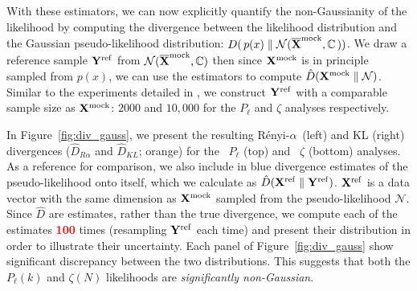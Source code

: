 \documentclass[12pt, letterpaper, preprint]{aastex}
\newcommand{\todo}[1]{{\bf \textcolor{red}{#1}}}
\newcommand{\Xmock}{{\bf X}^\mathrm{mock}}
\newcommand{\Xref}{{\bf X}^\mathrm{ref}}
\newcommand{\Yref}{{\bf Y}^\mathrm{ref}}
\newcommand{\Ralpha}{R\'enyi-$\alpha$}
\newcommand{\Beut}{\citetalias{beutler2017}}
\newcommand{\Sinh}{\citetalias{sinha2017a}}
\begin{document}
With these estimators, we can now explicitly quantify the 
non-Gaussianity of the likelihood by computing the divergence 
between the likelihood distribution and the Gaussian 
pseudo-likelihood distribution:
$D(\, p(x) \parallel \mathcal{N}(\overline{\bf X}^\mathrm{mock}, \mathbb{C}\,))$. 
We draw a reference sample ${\bf Y}^\mathrm{ref}$ from 
$\mathcal{N}(\overline{\bf X}^\mathrm{mock}, \mathbb{C})$ then 
since $\Xmock$ is in principle sampled from $p(x)$, we can use the 
estimators to compute $\hat{D}(\Xmock \parallel \mathcal{N})$.
Similar to the experiments detailed in \cite{poczos2012}, 
we construct ${\bf Y}^\mathrm{ref}$ with a comparable sample size as $\Xmock$: 
$2000$ and $10,000$ for the $P_\ell$ and $\zeta$ analyses respectively. 

In Figure~\ref{fig:div_gauss}, we present the resulting \Ralpha~(left) 
and KL (right) divergences ($\hat{D}_{R\alpha}$ and $\hat{D}_{KL}$; orange) 
for the \Beut~$P_\ell$ (top) and \Sinh~$\zeta$ (bottom) analyses.
As a reference for comparison, we also include in blue divergence 
estimates of the pseudo-likelihood onto itself, which we calculate as 
$\hat{D}(\Xref \parallel \Yref)$. $\Xref$ is a data vector with 
the same dimension as $\Xmock$ sampled from the pseudo-likelihood 
$\mathcal{N}$. Since $\hat{D}$ are estimates, rather than the true divergence, 
we compute each of the estimates \todo{100} times (resampling 
$\Yref$ each time) and present their distribution in order to 
illustrate their uncertainty.
Each panel of Figure~\ref{fig:div_gauss} show significant 
discrepancy between the two distributions. This suggests that both 
the $P_\ell(k)$ and $\zeta(N)$ likelihoods are \emph{significantly 
non-Gaussian}. 
\end{document}
